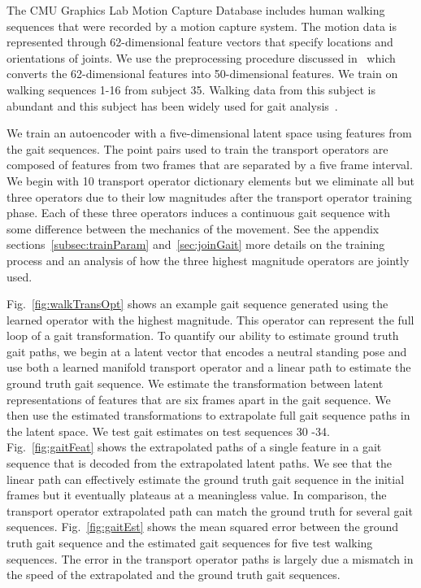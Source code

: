 \documentclass[letterpaper]{article} %
\begin{document}
The CMU Graphics Lab Motion Capture Database includes human walking sequences that were recorded by a motion capture system. The motion data is represented through 62-dimensional feature vectors that specify locations and orientations of joints. We use the preprocessing procedure discussed in~\cite{chen2015efficient} which converts the 62-dimensional features into 50-dimensional features. We train on walking sequences 1-16 from subject 35. Walking data from this subject is abundant and this subject has been widely used for gait analysis~\cite{chen2017metrics,chen2015efficient,taylor2007modeling}.

We train an autoencoder with a five-dimensional latent space using features from the gait sequences. The point pairs used to train the transport operators are composed of features from two frames that are separated by a five frame interval. We begin with 10 transport operator dictionary elements but we eliminate all but three operators due to their low magnitudes after the transport operator training phase. Each of these three operators induces a continuous gait sequence with some difference between the mechanics of the movement. See the appendix sections~\ref{subsec:trainParam} and~\ref{sec:joinGait} more details on the training process and an analysis of how the three highest magnitude operators are jointly used.

Fig.~\ref{fig:walkTransOpt} shows an example gait sequence generated using the learned operator with the highest magnitude. This operator can represent the full loop of a gait transformation. To quantify our ability to estimate ground truth gait paths, we begin at a latent vector that encodes a neutral standing pose and use both a learned manifold transport operator and a linear path to estimate the ground truth gait sequence. We estimate the transformation between latent representations of features that are six frames apart in the gait sequence. We then use the estimated transformations to extrapolate full gait sequence paths in the latent space. We test gait estimates on test sequences 30 -34. Fig.~\ref{fig:gaitFeat} shows the extrapolated paths of a single feature in a gait sequence that is decoded from the extrapolated latent paths. We see that the linear path can effectively estimate the ground truth gait sequence in the initial frames but it eventually plateaus at a meaningless value. In comparison, the transport operator extrapolated path can match the ground truth for several gait sequences.  Fig.~\ref{fig:gaitEst} shows the mean squared error between the ground truth gait sequence and the estimated gait sequences for five test walking sequences. The error in the transport operator paths is largely due a mismatch in the speed of the extrapolated and the ground truth gait sequences.
\end{document}
